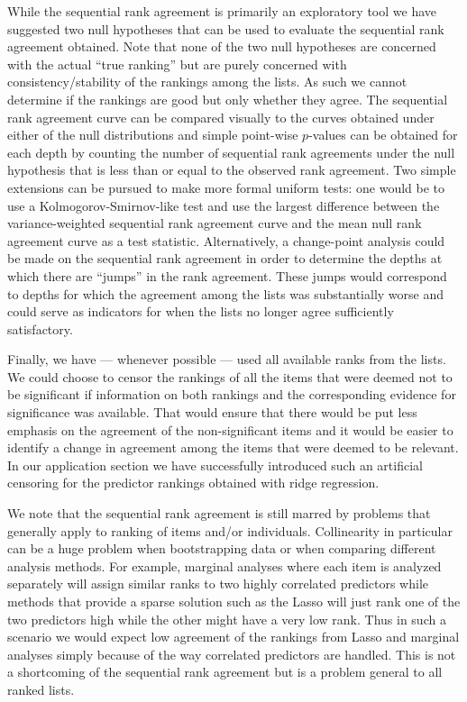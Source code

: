 \documentclass[12pt,a4paper]{article}
\theoremstyle{plain}
\begin{document}
While the sequential rank agreement is primarily an exploratory tool
we have suggested two null hypotheses that can be used to evaluate the
sequential rank agreement obtained. Note that none of the two null
hypotheses are concerned with the actual ``true ranking'' but are
purely concerned with consistency/stability of the rankings among the
lists. As such we cannot determine if the rankings are good but only
whether they agree. The sequential rank agreement curve can be
compared visually to the curves obtained under either of the null
distributions and simple point-wise $p$-values can be obtained for
each depth by counting the number of sequential rank agreements under
the null hypothesis that is less than or equal to the observed rank
agreement. Two simple extensions can be pursued to make more formal
uniform tests: one would be to use a Kolmogorov-Smirnov-like test and
use the largest difference between the variance-weighted sequential
rank agreement curve and the mean null rank agreement curve as a test
statistic. Alternatively, a change-point analysis could be made on the
sequential rank agreement in order to determine the depths at which
there are ``jumps'' in the rank agreement. These jumps would
correspond to depths for which the agreement among the lists was
substantially worse and could serve as indicators for when the lists
no longer agree sufficiently satisfactory.

Finally, we have --- whenever possible --- used all available ranks
from the lists.  We could choose to censor the rankings of all the
items that were deemed not to be significant if information on both
rankings and the corresponding evidence for significance was
available. That would ensure that there would be put less emphasis on
the agreement of the non-significant items and it would be easier to
identify a change in agreement among the items that were deemed to
be relevant. In our application section we have successfully introduced
such an artificial censoring for the predictor rankings obtained with
ridge regression.

We note that the sequential rank agreement is still marred by problems
that generally apply to ranking of items and/or
individuals. Collinearity in particular can be a huge problem when
bootstrapping data or when comparing different analysis methods. For
example, marginal analyses where each item is analyzed separately will
assign similar ranks to two highly correlated predictors while methods
that provide a sparse solution such as the Lasso will just rank one of
the two predictors high while the other might have a very low rank.
Thus in such a scenario we would expect low agreement of the rankings
from Lasso and marginal analyses simply because of the way correlated
predictors are handled. This is not a shortcoming of the sequential
rank agreement but is a problem general to all ranked lists.
\end{document}
